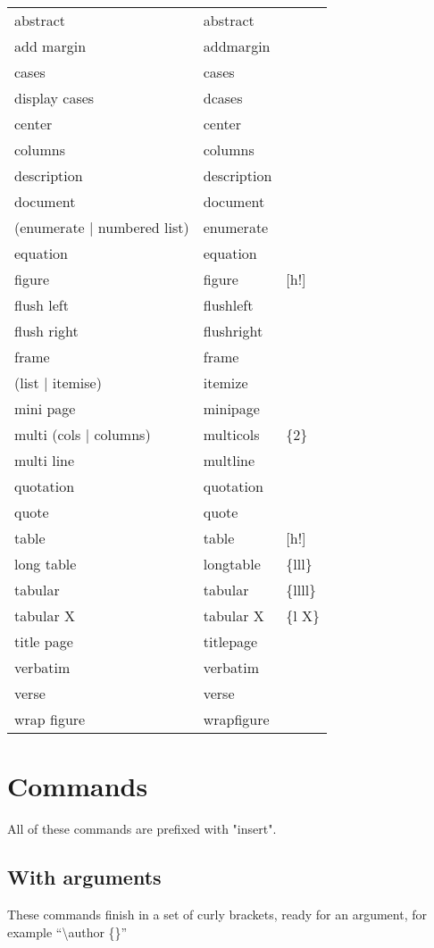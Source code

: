 \documentclass[12pt, a4paper]{article}
\begin{document}
\begin{longtable}{lll}
abstract & abstract & \\
add margin & addmargin & \\
cases & cases & \\
display cases & dcases \\
center & center & \\
columns & columns & \\
description & description & \\
document & document & \\
(enumerate | numbered list) & enumerate & \\
equation & equation & \\
figure & figure & [h!] \\
flush left & flushleft & \\
flush right & flushright & \\
frame & frame & \\
(list | itemise) & itemize & \\
mini page & minipage & \\
multi (cols | columns) & multicols & \{2\} \\
multi line & multline & \\
quotation & quotation & \\
quote & quote & \\
table & table & [h!] \\
long table & longtable & \{lll\} \\
tabular & tabular & \{llll\} \\
tabular X & tabular X & \{l X\} \\
title page & titlepage & \\
verbatim & verbatim & \\
verse & verse & \\
wrap figure & wrapfigure & \\
\end{longtable}

\section{Commands}
All of these commands are prefixed with "insert".

\subsection{With arguments}
These commands finish in a set of curly brackets, ready for an argument, for example ``\textbackslash author \{\}''
\end{document}

